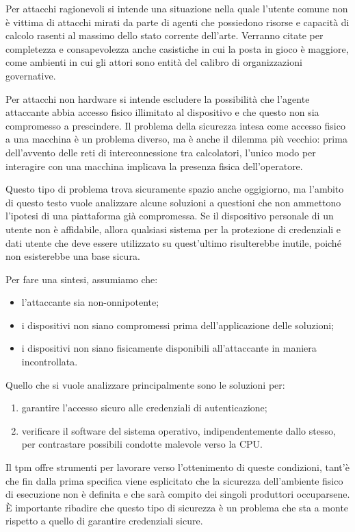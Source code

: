 Per attacchi ragionevoli si intende una situazione nella quale l'utente comune non è vittima di attacchi mirati da parte di agenti che possiedono risorse e capacità di calcolo rasenti al massimo dello stato corrente dell'arte. Verranno citate per completezza e consapevolezza anche casistiche in cui la posta in gioco è maggiore, come ambienti in cui gli attori sono entità del calibro di organizzazioni governative.

Per attacchi non hardware si intende escludere la possibilità che l'agente attaccante abbia accesso fisico illimitato al dispositivo e che questo non sia compromesso a prescindere. Il problema della sicurezza intesa come accesso fisico a una macchina è un problema diverso, ma è anche il dilemma più vecchio: prima dell'avvento delle reti di interconnessione tra calcolatori, l'unico modo per interagire con una macchina implicava la presenza fisica dell'operatore. 

Questo tipo di problema trova sicuramente spazio anche oggigiorno, ma l'ambito di questo testo vuole analizzare alcune soluzioni a questioni che non ammettono l'ipotesi di una piattaforma già compromessa. Se il dispositivo personale di un utente non è affidabile, allora qualsiasi sistema per la protezione di credenziali e dati utente che deve essere utilizzato su quest'ultimo risulterebbe inutile, poiché non esisterebbe una base sicura.

Per fare una sintesi, assumiamo che:
\begin{itemize}
    \item l'attaccante sia non-onnipotente;
    \item i dispositivi non siano compromessi prima dell'applicazione delle soluzioni;
    \item i dispositivi non siano fisicamente disponibili all'attaccante in maniera incontrollata.
\end{itemize}

Quello che si vuole analizzare principalmente sono le soluzioni per:
\begin{enumerate}
    \item garantire l'accesso sicuro alle credenziali di autenticazione;
    \item verificare il software del sistema operativo, indipendentemente dallo stesso, per contrastare possibili condotte malevole verso la CPU.
\end{enumerate}

Il \acrshort{tpm} offre strumenti per lavorare verso l'ottenimento di queste condizioni, tant'è che fin dalla prima specifica viene esplicitato che la sicurezza dell'ambiente fisico di esecuzione non è definita e che sarà compito dei singoli produttori occuparsene. È importante ribadire che questo tipo di sicurezza è un problema che sta a monte rispetto a quello di garantire credenziali sicure. 


